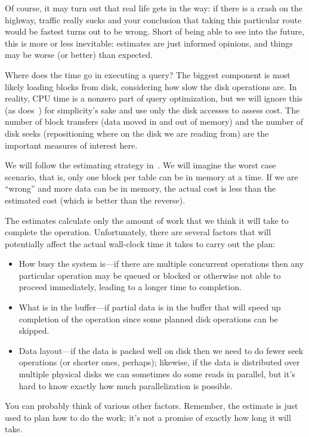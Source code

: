Of course, it may turn out that real life gets in the way: if there is a crash on the highway, traffic really sucks and your conclusion that taking this particular route would be fastest turns out to be wrong. Short of being able to see into the future, this is more or less inevitable: estimates are just informed opinions, and things may be worse (or better) than expected. 

Where does the time go in executing a query? The biggest component is most likely loading blocks from disk, considering how slow the disk operations are. In reality, CPU time is a nonzero part of query optimization, but we will ignore this (as does~\cite{dsc}) for simplicity's sake and use only the disk accesses to assess cost. The number of block transfers (data moved in and out of memory) and the number of disk seeks (repositioning where on the disk we are reading from) are the important measures of interest here. 

We will follow the estimating strategy in~\cite{dsc}. We will imagine the worst case scenario, that is, only one block per table can be in memory at a time. If we are ``wrong'' and more data can be in memory, the actual cost is less than the estimated cost (which is better than the reverse). 

The estimates calculate only the amount of work that we think it will take to complete the operation. Unfortunately, there are several factors that will potentially affect the actual wall-clock time it takes to carry out the plan:

\begin{itemize}
	\item How busy the system is---if there are multiple concurrent operations then any particular operation may be queued or blocked or otherwise not able to proceed immediately, leading to a longer time to completion.
	\item What is in the buffer---if partial data is in the buffer that will speed up completion of the operation since some planned disk operations can be skipped.
	\item Data layout---if the data is packed well on disk then we need to do fewer seek operations (or shorter ones, perhaps); likewise, if the data is distributed over multiple physical disks we can sometimes do some reads in parallel, but it's hard to know exactly how much parallelization is possible.
\end{itemize}

You can probably think of various other factors. Remember, the estimate is just used to plan how to do the work; it's not a promise of exactly how long it will take.

